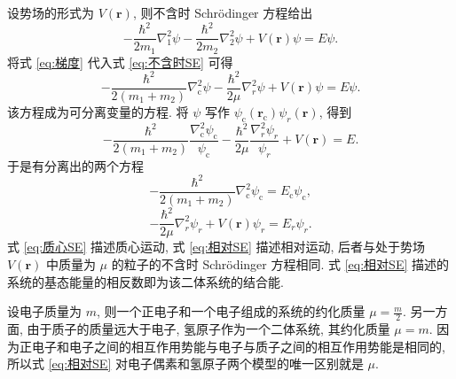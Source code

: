 \documentclass{article}
\begin{document}
设势场的形式为 $V\!\left(\mathbf r\right)$, 则不含时 Schrödinger 方程给出
\begin{equation}
	\label{eq:不含时SE}
	-\frac{\hbar^2}{2m_1}\nabla_1^2\psi-\frac{\hbar^2}{2m_2}\nabla_2^2\psi+V\!\left(\mathbf r\right)\psi=E\psi.
\end{equation}
将式 \ref{eq:梯度} 代入式 \ref{eq:不含时SE} 可得
\begin{equation}
	-\frac{\hbar^2}{2\left(m_1+m_2\right)}\nabla_\mathrm c^2\psi-\frac{\hbar^2}{2\mu}\nabla_r^2\psi+V\!\left(\mathbf r\right)\psi=E\psi.
\end{equation}
该方程成为可分离变量的方程.
将 $\psi$ 写作 $\psi_\mathrm c\!\left(\mathbf r_\mathrm c\right)\psi_r\!\left(\mathbf r\right)$,
得到
\begin{equation}
	-\frac{\hbar^2}{2\left(m_1+m_2\right)}\frac{\nabla_\mathrm c^2\psi_\mathrm c}{\psi_\mathrm c}-\frac{\hbar^2}{2\mu}\frac{\nabla_r^2\psi_r}{\psi_r}+V\!\left(\mathbf r\right)=E.
\end{equation}
于是有分离出的两个方程
\begin{equation}
	\label{eq:质心SE}
	-\frac{\hbar^2}{2\left(m_1+m_2\right)}\nabla_\mathrm c^2\psi_\mathrm c=E_\mathrm c\psi_\mathrm c,
\end{equation}
\begin{equation}
	\label{eq:相对SE}
	-\frac{\hbar^2}{2\mu}\nabla_r^2\psi_r+V\!\left(\mathbf r\right)\psi_r=E_r\psi_r.
\end{equation}
式 \ref{eq:质心SE} 描述质心运动, 式 \ref{eq:相对SE} 描述相对运动,
后者与处于势场 $V\!\left(\mathbf r\right)$ 中质量为 $\mu$ 的粒子的不含时 Schrödinger 方程相同.
式 \ref{eq:相对SE} 描述的系统的基态能量的相反数即为该二体系统的结合能.

设电子质量为 $m$, 则一个正电子和一个电子组成的系统的约化质量 $\mu=\frac m2$.
另一方面, 由于质子的质量远大于电子, 氢原子作为一个二体系统, 其约化质量 $\mu=m$.
因为正电子和电子之间的相互作用势能与电子与质子之间的相互作用势能是相同的,
所以式 \ref{eq:相对SE} 对电子偶素和氢原子两个模型的唯一区别就是 $\mu$.
\end{document}
